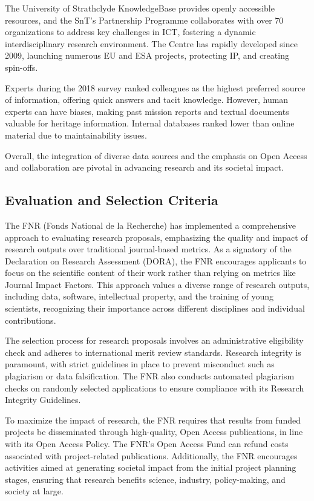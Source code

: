 \documentclass[12pt]{article}
\begin{document}
The University of Strathclyde KnowledgeBase provides openly accessible resources, and the SnT’s Partnership Programme collaborates with over 70 organizations to address key challenges in ICT, fostering a dynamic interdisciplinary research environment. The Centre has rapidly developed since 2009, launching numerous EU and ESA projects, protecting IP, and creating spin-offs.

Experts during the 2018 survey ranked colleagues as the highest preferred source of information, offering quick answers and tacit knowledge. However, human experts can have biases, making past mission reports and textual documents valuable for heritage information. Internal databases ranked lower than online material due to maintainability issues.

Overall, the integration of diverse data sources and the emphasis on Open Access and collaboration are pivotal in advancing research and its societal impact.

\subsection{Evaluation and Selection Criteria}

The FNR (Fonds National de la Recherche) has implemented a comprehensive approach to evaluating research proposals, emphasizing the quality and impact of research outputs over traditional journal-based metrics. As a signatory of the Declaration on Research Assessment (DORA), the FNR encourages applicants to focus on the scientific content of their work rather than relying on metrics like Journal Impact Factors. This approach values a diverse range of research outputs, including data, software, intellectual property, and the training of young scientists, recognizing their importance across different disciplines and individual contributions.

The selection process for research proposals involves an administrative eligibility check and adheres to international merit review standards. Research integrity is paramount, with strict guidelines in place to prevent misconduct such as plagiarism or data falsification. The FNR also conducts automated plagiarism checks on randomly selected applications to ensure compliance with its Research Integrity Guidelines.

To maximize the impact of research, the FNR requires that results from funded projects be disseminated through high-quality, Open Access publications, in line with its Open Access Policy. The FNR's Open Access Fund can refund costs associated with project-related publications. Additionally, the FNR encourages activities aimed at generating societal impact from the initial project planning stages, ensuring that research benefits science, industry, policy-making, and society at large.
\end{document}
